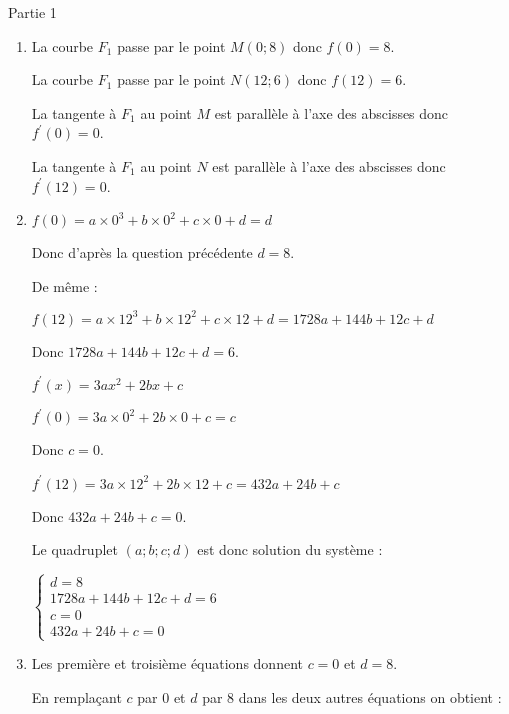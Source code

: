 \begin{corrige}
     \begin{h3}Partie 1\end{h3}
     \begin{enumerate}
          \item
          La courbe $F_1$ passe par le point $M(0;8)$ donc $f(0)=8$.
          \par
          La courbe $F_1$ passe par le point $N(12;6)$ donc $f(12)=6$.

     La tangente à $F_1$ au point $M$ est parallèle à l'axe des abscisses donc $f ^{\prime}(0)=0$.
     \par
     La tangente à $F_1$ au point $N$ est parallèle à l'axe des abscisses donc $f ^{\prime}(12)=0$.
     \item
     $f(0)=a\times 0^3+b \times 0^2+c \times 0+d=d$
     \par
     Donc d'après la question précédente $d=8$.
     \par
     De même :
     \par
     $f(12)=a\times 12^3+b \times 12^2+c \times 12+d$$=1728a+144b+12c+d$
     \par
     Donc  $1728a+144b+12c+d=6$.
     \par
     $f ^{\prime}(x)=3ax^2+2bx+c$
     \par
     $f ^{\prime}(0)=3a \times 0^2+2b \times 0+c=c$
     \par
     Donc $c=0$.
     \par
     $f ^{\prime}(12)=3a \times 12^2+2b \times 12+c=432a+24b+c$
     \par
     Donc $432a+24b+c=0$.
     \par
     Le quadruplet $(a;b;c;d)$ est donc solution du système :
     \par
     $\begin{cases}  d=8 \\ 1728a+144b+12c+d=6 \\ c=0 \\   432a+24b+c=0 \end{cases}$
     \item
     Les première et troisième équations donnent $c=0$ et $d=8$.
     \par
     En remplaçant $c$ par $0$ et $d$ par $8$ dans les deux autres équations on obtient :
     \par
$$
\end{enumerate}
\end{corrige}
